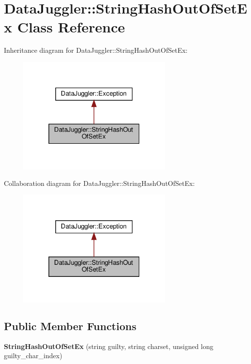 \hypertarget{classDataJuggler_1_1StringHashOutOfSetEx}{}\section{Data\+Juggler\+:\+:String\+Hash\+Out\+Of\+Set\+Ex Class Reference}
\label{classDataJuggler_1_1StringHashOutOfSetEx}


Inheritance diagram for Data\+Juggler\+:\+:String\+Hash\+Out\+Of\+Set\+Ex\+:\nopagebreak
\begin{figure}[H]
\begin{center}
\leavevmode
\includegraphics[width=220pt]{classDataJuggler_1_1StringHashOutOfSetEx__inherit__graph}
\end{center}
\end{figure}


Collaboration diagram for Data\+Juggler\+:\+:String\+Hash\+Out\+Of\+Set\+Ex\+:\nopagebreak
\begin{figure}[H]
\begin{center}
\leavevmode
\includegraphics[width=220pt]{classDataJuggler_1_1StringHashOutOfSetEx__coll__graph}
\end{center}
\end{figure}
\subsection*{Public Member Functions}
\begin{DoxyCompactItemize}
\item 
\mbox{\label{classDataJuggler_1_1StringHashOutOfSetEx_a47bfc18b15192c219a737aa54dbc3dd1}} 
{\bfseries String\+Hash\+Out\+Of\+Set\+Ex} (string guilty, string charset, unsigned long guilty\+\_\+char\+\_\+index)
\end{DoxyCompactItemize}
